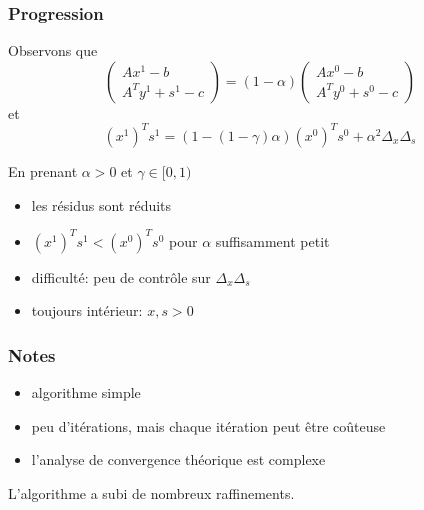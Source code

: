 \documentclass[usepdftitle=false,aspectratio=169]{beamer}
\begin{document}
\begin{frame}
\frametitle{Progression}

Observons que
$$
\begin{pmatrix}
Ax^1 - b \\ A^Ty^1 + s^1 - c
\end{pmatrix}
=
(1 - \alpha)
\begin{pmatrix}
Ax^0 - b \\ A^Ty^0 + s^0 - c
\end{pmatrix}
$$
et
$$
(x^1)^T s^1 = (1-(1-\gamma)\alpha)(x^0)^Ts^0+\alpha^2\Delta_x \Delta_s
$$

\mbox{}

En prenant $\alpha > 0$ et $\gamma \in [0,1)$
\begin{itemize}
	\item les résidus sont réduits
	\item $(x^1)^Ts^1 < (x^0)^Ts^0$ pour $\alpha$ suffisamment petit
	\item difficulté: peu de contrôle sur $\Delta_x \Delta_s$
	\item toujours intérieur: $x, s > 0$
\end{itemize}

\end{frame}

\begin{frame}
\frametitle{Notes}

\begin{itemize}
	\item algorithme simple
	\item peu d'itérations, mais chaque itération peut être coûteuse
	\item l'analyse de convergence théorique est complexe
\end{itemize}

\mbox{}

L'algorithme a subi de nombreux raffinements.

\end{frame}
\end{document}
